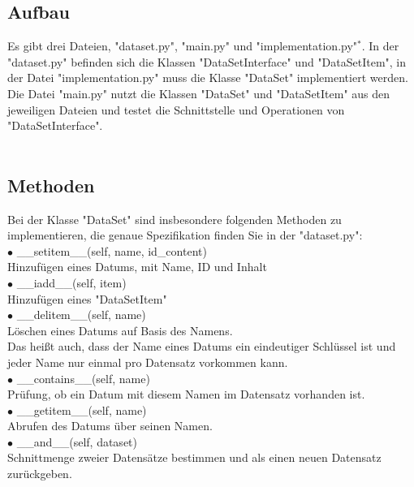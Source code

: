 \documentclass{article}
\begin{document}
		\subsection{Aufbau}
			Es gibt drei Dateien, "dataset.py", "main.py" und "implementation.py"$^*$.
			In der "dataset.py" befinden sich die Klassen "DataSetInterface" und "DataSetItem",
			in der Datei "implementation.py" muss die Klasse "DataSet" implementiert werden.
			Die Datei "main.py" nutzt die Klassen "DataSet" und "DataSetItem" aus den jeweiligen Dateien und testet die Schnittstelle und Operationen von "DataSetInterface".\\
			\\
	
		\subsection{Methoden}
			Bei der Klasse "DataSet" sind insbesondere folgenden Methoden zu implementieren, die genaue Spezifikation finden Sie in der "dataset.py":\\
			$\bullet$ \_\_setitem\_\_(self, name, id\_content)\\
			\hspace*{1cm} Hinzufügen eines Datums, mit Name, ID und Inhalt\\
			$\bullet$ \_\_iadd\_\_(self, item)\\
			\hspace*{1cm} Hinzufügen eines "DataSetItem"\\
			$\bullet$ \_\_delitem\_\_(self, name)\\
			\hspace*{1cm} Löschen eines Datums auf Basis des Namens.\\
			\hspace*{1cm} Das heißt auch, dass der Name eines Datums ein eindeutiger Schlüssel ist und jeder Name nur einmal pro Datensatz vorkommen kann.\\
			$\bullet$ \_\_contains\_\_(self, name)\\
			\hspace*{1cm} Prüfung, ob ein Datum mit diesem Namen im Datensatz vorhanden ist.\\
			$\bullet$ \_\_getitem\_\_(self, name)\\
			\hspace*{1cm} Abrufen des Datums über seinen Namen.\\ 
			$\bullet$ \_\_and\_\_(self, dataset)\\
			\hspace*{1cm} Schnittmenge zweier Datensätze bestimmen und als einen neuen Datensatz zurückgeben.\\
\end{document}
